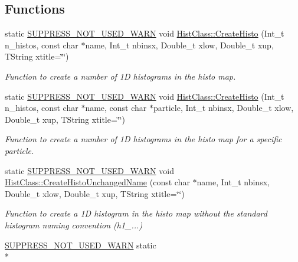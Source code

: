\subsection*{Functions}
\begin{DoxyCompactItemize}
\item 
static \hyperlink{HistClass_8hh_a85edd6ac47f5ea2970c76af20855738c}{S\-U\-P\-P\-R\-E\-S\-S\-\_\-\-N\-O\-T\-\_\-\-U\-S\-E\-D\-\_\-\-W\-A\-R\-N} void \hyperlink{namespaceHistClass_afe4c53f5990fecb7acf800a1677632fd}{Hist\-Class\-::\-Create\-Histo} (Int\-\_\-t n\-\_\-histos, const char $\ast$name, Int\-\_\-t nbinsx, Double\-\_\-t xlow, Double\-\_\-t xup, T\-String xtitle=\char`\"{}\char`\"{})
\begin{DoxyCompactList}\small\item\em Function to create a number of 1\-D histograms in the histo map. \end{DoxyCompactList}\item 
static \hyperlink{HistClass_8hh_a85edd6ac47f5ea2970c76af20855738c}{S\-U\-P\-P\-R\-E\-S\-S\-\_\-\-N\-O\-T\-\_\-\-U\-S\-E\-D\-\_\-\-W\-A\-R\-N} void \hyperlink{namespaceHistClass_ad978c86aade850ac341be3e75c4cfcf6}{Hist\-Class\-::\-Create\-Histo} (Int\-\_\-t n\-\_\-histos, const char $\ast$name, const char $\ast$particle, Int\-\_\-t nbinsx, Double\-\_\-t xlow, Double\-\_\-t xup, T\-String xtitle=\char`\"{}\char`\"{})
\begin{DoxyCompactList}\small\item\em Function to create a number of 1\-D histograms in the histo map for a specific particle. \end{DoxyCompactList}\item 
static \hyperlink{HistClass_8hh_a85edd6ac47f5ea2970c76af20855738c}{S\-U\-P\-P\-R\-E\-S\-S\-\_\-\-N\-O\-T\-\_\-\-U\-S\-E\-D\-\_\-\-W\-A\-R\-N} void \hyperlink{namespaceHistClass_a42ccd4d03cdfb5e52c4976b966b662a9}{Hist\-Class\-::\-Create\-Histo\-Unchanged\-Name} (const char $\ast$name, Int\-\_\-t nbinsx, Double\-\_\-t xlow, Double\-\_\-t xup, T\-String xtitle=\char`\"{}\char`\"{})
\begin{DoxyCompactList}\small\item\em Function to create a 1\-D histogram in the histo map without the standard histogram naming convention (h1\-\_\-...) \end{DoxyCompactList}\item 
\hyperlink{HistClass_8hh_a85edd6ac47f5ea2970c76af20855738c}{S\-U\-P\-P\-R\-E\-S\-S\-\_\-\-N\-O\-T\-\_\-\-U\-S\-E\-D\-\_\-\-W\-A\-R\-N} static \\*

\end{DoxyCompactItemize}
